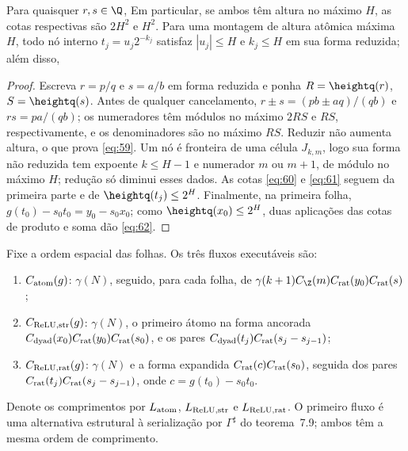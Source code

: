 \begin{lema}
Para quaisquer $r,s\in\Q$,
Em particular, se ambos têm altura no máximo $H$, as cotas respectivas são $2H^2$ e $H^2$. Para uma montagem de altura atômica máxima $H$, todo nó interno $t_j=u_j2^{-k_j}$ satisfaz $|u_j|\le H$ e $k_j\le H$ em sua forma reduzida; além disso,
\end{lema}
\begin{proof}
Escreva $r=p/q$ e $s=a/b$ em forma reduzida e ponha $R=\heightq(r)$, $S=\heightq(s)$. Antes de qualquer cancelamento, $r\pm s=(pb\pm aq)/(qb)$ e $rs=pa/(qb)$; os numeradores têm módulos no máximo $2RS$ e $RS$, respectivamente, e os denominadores são no máximo $RS$. Reduzir não aumenta altura, o que prova \eqref{eq:59}. Um nó é fronteira de uma célula $J_{k,m}$, logo sua forma não reduzida tem expoente $k\le H-1$ e numerador $m$ ou $m+1$, de módulo no máximo $H$; redução só diminui esses dados. As cotas \eqref{eq:60} e \eqref{eq:61} seguem da primeira parte e de $\heightq(t_j)\le2^H$. Finalmente, na primeira folha, $g(t_0)-s_0t_0=y_0-s_0x_0$; como $\heightq(x_0)\le2^H$, duas aplicações das cotas de produto e soma dão \eqref{eq:62}.
\end{proof}
Fixe a ordem espacial das folhas. Os três fluxos executáveis são:
\begin{enumerate}[label=(\roman*),topsep=5pt,itemsep=4pt]
\item $C_{\rm atom}(g)$: $\gamma(N)$, seguido, para cada folha, de $\gamma(k+1)C_{\Z}(m)C_{\rm rat}(y_0)C_{\rm rat}(s)$;
\item $C_{\rm ReLU,str}(g)$: $\gamma(N)$, o primeiro átomo na forma ancorada $C_{\rm dyad}(x_0)C_{\rm rat}(y_0)C_{\rm rat}(s_0)$, e os pares $C_{\rm dyad}(t_j)C_{\rm rat}(s_j-s_{j-1})$;
\item $C_{\rm ReLU,rat}(g)$: $\gamma(N)$ e a forma expandida $C_{\rm rat}(c)C_{\rm rat}(s_0)$, seguida dos pares $C_{\rm rat}(t_j)C_{\rm rat}(s_j-s_{j-1})$, onde $c=g(t_0)-s_0t_0$.
\end{enumerate}
Denote os comprimentos por $L_{\rm atom}$, $L_{\rm ReLU,str}$ e $L_{\rm ReLU,rat}$. O primeiro fluxo é uma alternativa estrutural à serialização por $\Gamma^\sharp$ do teorema~7.9; ambos têm a mesma ordem de comprimento.

